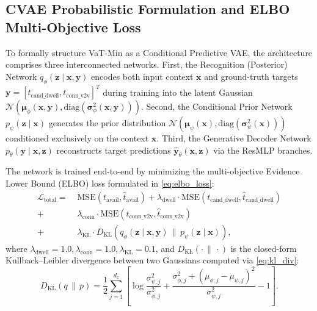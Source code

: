 \documentclass[journal]{IEEEtran}
\begin{document}
\subsection{CVAE Probabilistic Formulation and ELBO Multi-Objective Loss}\label{sec:loss}
To formally structure VaT-Min as a Conditional Predictive VAE, the architecture comprises three interconnected networks. First, the Recognition (Posterior) Network $q_\phi(\mathbf{z} \mid \mathbf{x}, \mathbf{y})$ encodes both input context $\mathbf{x}$ and ground-truth targets $\mathbf{y} = [t_{\text{cand\_dwell}}, t_{\text{conn\_v2v}}]^T$ during training into the latent Gaussian $\mathcal{N}(\boldsymbol{\mu}_\phi(\mathbf{x}, \mathbf{y}), \text{diag}(\boldsymbol{\sigma}_\phi^2(\mathbf{x}, \mathbf{y})))$. Second, the Conditional Prior Network $p_\psi(\mathbf{z} \mid \mathbf{x})$ generates the prior distribution $\mathcal{N}(\boldsymbol{\mu}_\psi(\mathbf{x}), \text{diag}(\boldsymbol{\sigma}_\psi^2(\mathbf{x})))$ conditioned exclusively on the context $\mathbf{x}$. Third, the Generative Decoder Network $p_\theta(\mathbf{y} \mid \mathbf{x}, \mathbf{z})$ reconstructs target predictions $\hat{\mathbf{y}}_\theta(\mathbf{x}, \mathbf{z})$ via the ResMLP branches.

The network is trained end-to-end by minimizing the multi-objective Evidence Lower Bound (ELBO) loss formulated in \eqref{eq:elbo_loss}:
\begin{equation}
\begin{split}
\mathcal{L}_{\text{total}} = &\;\text{MSE}(t_{\text{avail}}, \hat{t}_{\text{avail}}) + \lambda_{\text{dwell}} \cdot \text{MSE}(t_{\text{cand\_dwell}}, \hat{t}_{\text{cand\_dwell}}) \\
+ &\;\lambda_{\text{conn}} \cdot \text{MSE}(t_{\text{conn\_v2v}}, \hat{t}_{\text{conn\_v2v}}) \\
+ &\;\lambda_{\text{KL}} \cdot D_{\text{KL}}\left(q_\phi(\mathbf{z} \mid \mathbf{x}, \mathbf{y}) \,\|\, p_\psi(\mathbf{z} \mid \mathbf{x})\right),
\end{split}
\label{eq:elbo_loss}
\end{equation}
where $\lambda_{\text{dwell}} = 1.0, \lambda_{\text{conn}} = 1.0, \lambda_{\text{KL}} = 0.1$, and $D_{\text{KL}}(\cdot \,\|\, \cdot)$ is the closed-form Kullback--Leibler divergence between two Gaussians computed via \eqref{eq:kl_div}:
\begin{equation}
D_{\text{KL}}(q \,\|\, p) = \frac{1}{2} \sum_{j=1}^{d_z} \left[ \log\frac{\sigma_{\psi,j}^2}{\sigma_{\phi,j}^2} + \frac{\sigma_{\phi,j}^2 + (\mu_{\phi,j} - \mu_{\psi,j})^2}{\sigma_{\psi,j}^2} - 1 \right].
\label{eq:kl_div}
\end{equation}
\end{document}
